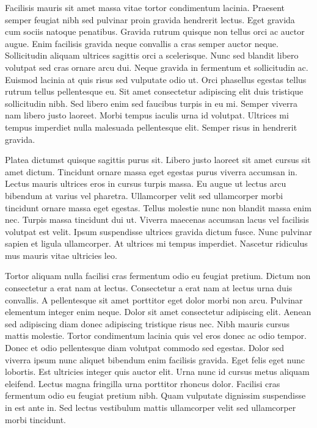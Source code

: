 \documentclass[11pt,a4paper]{article}
\begin{document}
Facilisis mauris sit amet massa vitae tortor condimentum lacinia. Praesent semper feugiat nibh sed pulvinar proin gravida hendrerit lectus. Eget gravida cum sociis natoque penatibus. Gravida rutrum quisque non tellus orci ac auctor augue. Enim facilisis gravida neque convallis a cras semper auctor neque. Sollicitudin aliquam ultrices sagittis orci a scelerisque. Nunc sed blandit libero volutpat sed cras ornare arcu dui. Neque gravida in fermentum et sollicitudin ac. Euismod lacinia at quis risus sed vulputate odio ut. Orci phasellus egestas tellus rutrum tellus pellentesque eu. Sit amet consectetur adipiscing elit duis tristique sollicitudin nibh. Sed libero enim sed faucibus turpis in eu mi. Semper viverra nam libero justo laoreet. Morbi tempus iaculis urna id volutpat. Ultrices mi tempus imperdiet nulla malesuada pellentesque elit. Semper risus in hendrerit gravida.

Platea dictumst quisque sagittis purus sit. Libero justo laoreet sit amet cursus sit amet dictum. Tincidunt ornare massa eget egestas purus viverra accumsan in. Lectus mauris ultrices eros in cursus turpis massa. Eu augue ut lectus arcu bibendum at varius vel pharetra. Ullamcorper velit sed ullamcorper morbi tincidunt ornare massa eget egestas. Tellus molestie nunc non blandit massa enim nec. Turpis massa tincidunt dui ut. Viverra maecenas accumsan lacus vel facilisis volutpat est velit. Ipsum suspendisse ultrices gravida dictum fusce. Nunc pulvinar sapien et ligula ullamcorper. At ultrices mi tempus imperdiet. Nascetur ridiculus mus mauris vitae ultricies leo.

Tortor aliquam nulla facilisi cras fermentum odio eu feugiat pretium. Dictum non consectetur a erat nam at lectus. Consectetur a erat nam at lectus urna duis convallis. A pellentesque sit amet porttitor eget dolor morbi non arcu. Pulvinar elementum integer enim neque. Dolor sit amet consectetur adipiscing elit. Aenean sed adipiscing diam donec adipiscing tristique risus nec. Nibh mauris cursus mattis molestie. Tortor condimentum lacinia quis vel eros donec ac odio tempor. Donec et odio pellentesque diam volutpat commodo sed egestas. Dolor sed viverra ipsum nunc aliquet bibendum enim facilisis gravida. Eget felis eget nunc lobortis. Est ultricies integer quis auctor elit. Urna nunc id cursus metus aliquam eleifend. Lectus magna fringilla urna porttitor rhoncus dolor. Facilisi cras fermentum odio eu feugiat pretium nibh. Quam vulputate dignissim suspendisse in est ante in. Sed lectus vestibulum mattis ullamcorper velit sed ullamcorper morbi tincidunt.
\end{document}
